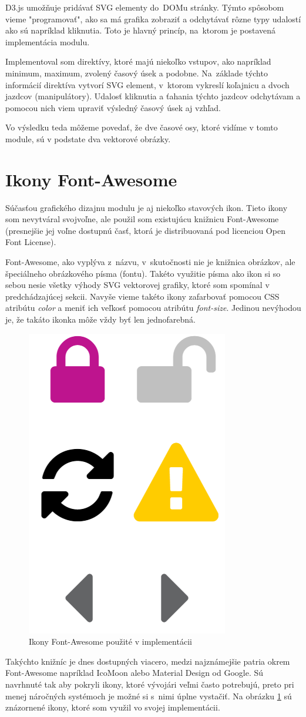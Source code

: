 \documentclass[
  printed, %
  twoside, %
  notable,   %
  nolof,   %
  nolot,   %
]{fithesis3}
\newcommand{\inquotes}[1]{{}"{}#1{}"{}}
\begin{document}
D3.js umožňuje pridávať SVG elementy do~DOMu stránky. Týmto spôsobom vieme \inquotes{programovať}, ako sa má grafika zobraziť a odchytávať rôzne typy udalostí ako sú napríklad kliknutia. Toto je hlavný princíp, na~ktorom je postavená implementácia modulu.

Implementoval som direktívy, ktoré majú niekoľko vstupov, ako napríklad minimum, maximum, zvolený časový úsek a podobne. Na~základe týchto informácií direktíva vytvorí SVG element, v~ktorom vykreslí koľajnicu a dvoch jazdcov (manipulátory). Udalosť kliknutia a ťahania týchto jazdcov odchytávam a pomocou nich viem upraviť výsledný časový úsek aj vzhľad.

Vo výsledku teda môžeme povedať, že dve časové osy, ktoré vidíme v tomto module, sú v podstate dva vektorové obrázky.

\section{Ikony Font-Awesome}
Súčasťou grafického dizajnu modulu je aj niekoľko stavových ikon. Tieto ikony som nevytváral svojvoľne, ale použil som existujúcu knižnicu Font-Awesome (presnejšie jej voľne dostupnú časť, ktorá je distribuovaná pod licenciou Open Font License).

Font-Awesome, ako vyplýva z~názvu, v~skutočnosti nie je knižnica obrázkov, ale špeciálneho obrázkového písma (fontu). Takéto využitie písma ako ikon si so sebou nesie všetky výhody SVG vektorovej grafiky, ktoré som spomínal v predchádzajúcej sekcii. Navyše vieme takéto ikony zafarbovať pomocou CSS atribútu \textit{color} a meniť ich veľkosť pomocou atribútu \textit{font-size}. Jedinou nevýhodou je, že takáto ikonka môže vždy byť len jednofarebná.

\begin{figure}
	\center
	\includegraphics[width=.22\linewidth]{icons}
	\caption{Ikony Font-Awesome použité v implementácii}
	\label{icons}
\end{figure}

Takýchto knižníc je dnes dostupných viacero, medzi najznámejšie patria okrem Font-Awesome napríklad IcoMoon alebo Material Design od Google. Sú navrhnuté tak aby pokryli ikony, ktoré vývojári veľmi často potrebujú, preto pri menej náročných systémoch je možné si s~nimi úplne vystačiť. Na obrázku \ref{icons} sú znázornené ikony, ktoré som využil vo svojej implementácii.
\end{document}
